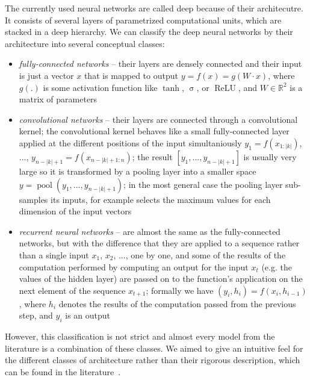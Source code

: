 \documentclass[runningheads,a4paper]{llncs}
\begin{document}
The currently used neural networks are called deep because of their architecutre. It consists of several layers of parametrized computational units, which are stacked in a deep hierarchy. We can classify the deep neural networks by their architecture into several conceptual classes:
\begin{itemize}
  \item \emph{fully-connected networks} -- their layers are densely connected and their input is just a vector $x$ that is mapped to output $y=f(x)=g(W\cdot x)$, where $g(.)$ is some activation function like $\operatorname{tanh}$, $\operatorname{\sigma}$, or $\operatorname{ReLU}$, and $W\in \mathbb{R}^2$ is a matrix of parameters
  \item \emph{convolutional networks} -- their layers are connected through a convolutional kernel; the convolutional kernel behaves like a small fully-connected layer applied at the different positions of the input simultaniously $y_1=f(x_{1:|k|})$, ..., $y_{n-|k|+1}=f(x_{n-|k|+1:n})$; the result $[y_1, ..., y_{n-|k|+1}]$ is usually very large so it is transformed by a pooling layer into a smaller space $y=\operatorname{pool}(y_1, ..., y_{n-|k|+1})$; in the most general case the pooling layer sub-samples its inputs, for example selects the maximum values for each dimension of the input vectors
  \item \emph{recurrent neural networks} -- are almost the same as the fully-connected networks, but with the difference that they are applied to a sequence rather than a single input $x_1$, $x_2$, ..., one by one, and some of the results of the computation performed by computing an output for the input $x_t$ (e.g. the values of the hidden layer) are passed on to the function's application on the next element of the sequence $x_{t+1}$; formally we have $(y_i, h_i) = f(x_i, h_{i-1})$, where $h_i$ denotes the results of the computation passed from the previous step, and $y_i$ is an output
\end{itemize}
However, this classification is not strict and almost every model from the literature is a combination of these classes. We aimed to give an intuitive feel for the different classes of architecture rather than their rigorous description, which can be found in the literature~\cite{graves2013generating}.
\end{document}
